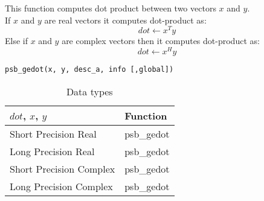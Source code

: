 This function computes dot product between two vectors $x$ and
$y$.\\
If $x$ and $y$ are real vectors
it computes dot-product as:
\[dot \leftarrow x^T y\]
Else if $x$ and $y$ are complex vectors then it computes dot-product as:
\[dot \leftarrow x^H y\]

\begin{verbatim}
psb_gedot(x, y, desc_a, info [,global])
\end{verbatim}
\begin{table}[h]
\begin{center}
\begin{tabular}{ll}
\hline
$dot$, $x$, $y$ & {\bf Function}\\
\hline
Short Precision Real & psb\_gedot \\
Long Precision Real & psb\_gedot \\
Short Precision Complex & psb\_gedot \\	
Long Precision Complex & psb\_gedot \\	
\hline
\end{tabular}
\end{center}
\caption{Data types\label{tab:f90dot}}
\end{table}

